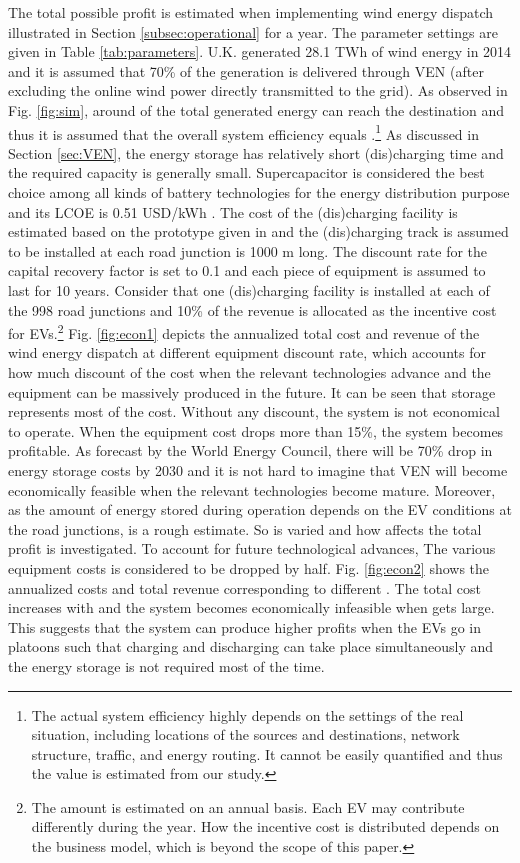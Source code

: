 \documentclass[journal]{IEEEtran}
\begin{document}
The total possible profit is estimated when implementing wind energy dispatch illustrated in Section \ref{subsec:operational} for a year. The parameter settings are given in Table \ref{tab:parameters}. U.K. generated 28.1 TWh of wind energy in 2014 \cite{UKWind} and it is assumed that 70\% of the generation is delivered through VEN (after excluding the online wind power directly transmitted to the grid). As observed in Fig. \ref{fig:sim}, around  of the total generated energy can reach the destination and thus it is assumed that the overall system efficiency equals .\footnote{The actual system efficiency highly depends on the settings of the real situation, including locations of the sources and destinations, network structure, traffic, and energy routing. It cannot be easily quantified and thus the value is estimated from our study.} 
As discussed in Section \ref{sec:VEN}, the energy storage has relatively short (dis)charging time and the required capacity is generally small. Supercapacitor is considered the best choice among all kinds of battery technologies for the energy distribution purpose and its LCOE is 0.51 USD/kWh \cite{storagecost}. The cost of the (dis)charging facility is estimated based on the prototype given in \cite{EconDCEV} and the (dis)charging track is assumed to be installed at each road junction is 1000 m long. The discount rate for the capital recovery factor is set to 0.1 and each piece of equipment is assumed to last for 10 years. Consider that one (dis)charging facility is installed at each of the 998 road junctions and 10\% of the revenue is allocated as the incentive cost for EVs.\footnote{The amount is estimated on an annual basis. Each EV may contribute differently during the year. How the incentive cost is distributed depends on the business model, which is beyond the scope of this paper.} Fig. \ref{fig:econ1} depicts the annualized total cost and revenue of the wind energy dispatch at different equipment discount rate, which accounts for how much discount of the cost when the relevant technologies advance and the equipment can be massively produced in the future. It can be seen that storage represents most of the cost. Without any discount, the system is not economical to operate. When the equipment cost drops more than 15\%, the system becomes profitable. 
As forecast by the World Energy Council, there will be 70\% drop in energy storage costs by 2030 \cite{worldenergy} and it is not hard to imagine that VEN will become economically feasible when the relevant technologies become mature.
Moreover, as the amount of energy stored during operation depends on the EV conditions at the road junctions,  is a rough estimate. So  is varied and  how  affects the total profit is investigated. To account for future technological advances, The various equipment costs is considered to be dropped by half. Fig. \ref{fig:econ2} shows the annualized costs and total revenue corresponding to different . The total cost increases with  and the system becomes economically infeasible when  gets large. This suggests that the system can produce higher profits when the EVs go in platoons such that charging and discharging can take place simultaneously and the energy storage is not required most of the time.
\end{document}
